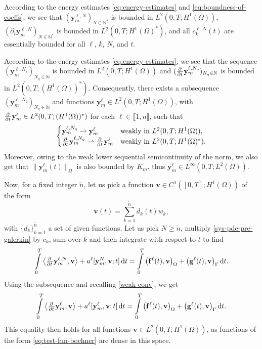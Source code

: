 \documentclass[11pt]{article}
\newcommand{\N}{\mathbb{N}}
\newcommand{\llb}{\llbracket}
\newcommand{\rrb}{\rrbracket}
\newcommand{\by}{\mathbf{y}}
\newcommand{\bv}{\mathbf{v}}
\begin{document}
	According to the energy estimates \eqref{eq:energy-estimates} and \eqref{eq:boundness-of-coeffs}, we see that \((\by_m^{\ell,N})_{N\in \N^*}\) is bounded in \(L^2(0,T;H^1(\Omega))\), \((\partial_t \by_m^{\ell,N})_{N\in \N^*}\) is bounded in \(L^2(0,T;H^1(\Omega)^*)\), and all \( c_k^{\ell,N} (t)\) are essentially bounded for all \(\ell\), \(k\), \(N\), and \(t\). 
	
	
	According to the energy estimates \eqref{eq:energy-estimates}, we see that the sequence \((\by_m^{\ell,N_q})_{N_q\in \N}\)  is bounded in \(L^2(0,T;H^1(\Omega))\) and \((\pd{ }{t}\by_m^{\ell,N_q})_{N_q\in \N}\)  is bounded in \(L^2(0,T;(H^1(\Omega))^*)\). Consequently, there exists a subsequence \((\by_m^{\ell,N_q})_{N_q\in \N}\) and functions \(\by_m^{\ell} \in L^2(0,T;H^1(\Omega))\),  with \(\pd{ }{t}\by_m^{\ell} \in L^2(0,T;(H^1(\Omega))^*)\) for each \(\ell \in \llb1,n\rrb\), such that
	\begin{equation}
	\label{weak-conv}
		\begin{cases}
			\by_m^{\ell,N_q} \rightharpoonup \by_m^{\ell} & \text{weakly in } L^2(0,T;H^1(\Omega)),
			\\
			\pd{ }{t}\by_m^{\ell,N_q} \rightharpoonup \pd{ }{t} \by_m^{\ell} & \text{weakly in } L^2(0,T;H^1(\Omega)^*).
		\end{cases}
	\end{equation}
	Moreover, owing to the weak lower sequential semicontinuity of the norm, we also get that \(\|\by_m^\ell(t)\|_\Omega\) is also bounded by \(K_{m}\), thus \(\by_m^\ell \in L^\infty (0,T; L^2 (\Omega))\).



Now, for a fixed integer \(\tilde n\), let us pick a function \( \bv \in C^1([0,T]; H^1(\Omega))\) of the form
	\begin{equation}
	\label{eq:test-fun-bochner}
		\bv(t) = \sum_{k=1}^{\tilde n} d_k(t) w_k,
	\end{equation}
	with \(\{d_k\}_{k=1}^{\tilde n}\) a set of given functions.
	Let us pick \(N \geq \tilde n\), multiply \eqref{sys-pde-pre-galerkin} by \(c_k\), sum over \(k\) and then integrate with respect to \(t\) to find
	\[
		\int\limits_0^T
		\big\langle \pd{ }{t} \by_m^{\ell,N}, \bv \big\rangle + 
		a^\ell [\mathbf y_m^{N}, \bv; t] \dif t
		=
		\int\limits_0^T
		\big( \mathbf{f}^\ell (t), \bv \big)_{\Omega} + \big(\mathbf{g}^\ell (t),  \bv \big)_{\Gamma}
		\dif t.
	\]
	Using the subsequence and recalling \eqref{weak-conv}, we get
	\begin{equation}
	\label{eq:variational}
		\int\limits_0^T
		\big\langle \pd{ }{t} \by_m^{\ell}, \bv \big\rangle + 
		a^\ell [\mathbf y_m^{\ell}, \bv; t] \dif t
		=
		\int\limits_0^T
		\big( \mathbf{f}^\ell (t), \bv \big)_{\Omega} + \big(\mathbf{g}^\ell (t),  \bv \big)_{\Gamma}
		\dif t.
	\end{equation}
	This equality then holds for all functions \( \bv \in L^2(0,T;H^1(\Omega))\), as functions of the form \eqref{eq:test-fun-bochner} are dense in this space. %
	
\end{document}
